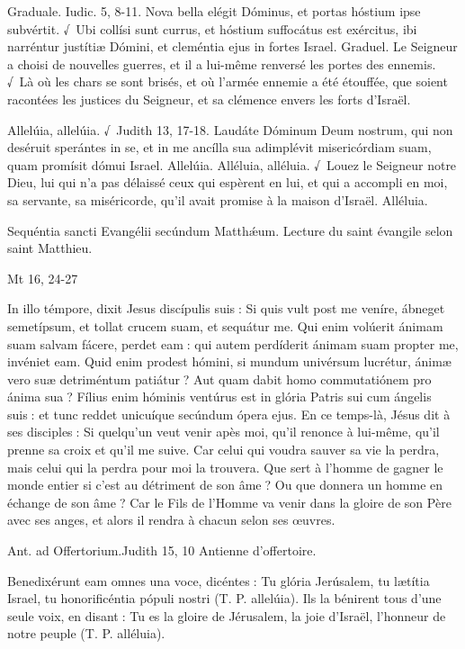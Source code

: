 \begin{paracol}{2}
Graduale. Iudic. 5, 8-11. Nova bella elégit Dóminus, et portas hóstium ipse subvértit. √~Ubi collísi sunt currus, et hóstium suffocátus est exércitus, ibi narréntur justítiæ Dómini, et cleméntia ejus in fortes Israel.
\switchcolumn
Graduel. Le Seigneur a choisi de nouvelles guerres, et il a lui-même renversé les portes des ennemis. √~Là où les chars se sont brisés, et où l’armée ennemie a été étouffée, que soient racontées les justices du Seigneur, et sa clémence envers les forts d’Israël.
\switchcolumn*

Allelúia, allelúia. √~Judith 13, 17-18. Laudáte Dóminum Deum nostrum, qui non deséruit sperántes in se, et in me ancílla sua adimplévit misericórdiam suam, quam promísit dómui Israel. Allelúia.
\switchcolumn
Alléluia, alléluia. √~Louez le Seigneur notre Dieu, lui qui n’a pas délaissé ceux qui espèrent en lui, et qui a accompli en moi, sa servante, sa miséricorde, qu’il avait promise à la maison d’Israël. Alléluia.
\switchcolumn*

Sequéntia sancti Evangélii secúndum Matthǽum.
\switchcolumn
Lecture du saint évangile selon saint Matthieu.
\switchcolumn*

Mt 16, 24-27
\switchcolumn

\switchcolumn*

In illo témpore, dixit Jesus discípulis  suis : Si quis vult post me veníre, ábneget semetípsum, et tollat crucem suam, et sequátur me. Qui enim volúerit ánimam suam salvam fácere, perdet eam : qui autem perdíderit ánimam suam propter me, invéniet eam. Quid enim prodest hómini, si mundum univérsum lucrétur, ánimæ vero suæ detriméntum patiátur ? Aut quam dabit homo commutatiónem pro ánima sua ? Fílius enim hóminis ventúrus est in glória Patris sui cum ángelis suis : et tunc reddet unicuíque secúndum ópera ejus.
\switchcolumn
En ce temps-là, Jésus dit à ses disciples :  Si quelqu’un veut venir apès moi, qu’il renonce à lui-même, qu’il prenne sa croix et qu’il me suive. Car celui qui voudra sauver sa vie la perdra, mais celui qui la perdra pour moi la trouvera. Que sert à l’homme de gagner le monde entier si c’est au détriment de son âme ? Ou que donnera un homme en échange de son âme ? Car le Fils de l’Homme va venir dans la gloire de son Père avec ses anges, et alors il rendra à chacun selon ses œuvres.
\switchcolumn*

Ant. ad Offertorium.\hfill Judith 15, 10
\switchcolumn
Antienne d’offertoire.
\switchcolumn*

Benedixérunt eam omnes una voce, dicéntes : Tu glória Jerúsalem, tu lætítia Israel, tu honorificéntia pópuli nostri (T. P. allelúia).
\switchcolumn
Ils la bénirent tous d’une seule voix, en disant : Tu es la gloire de Jérusalem, la joie d’Israël, l’honneur de notre peuple (T. P. alléluia).
\switchcolumn*


\end{paracol}
